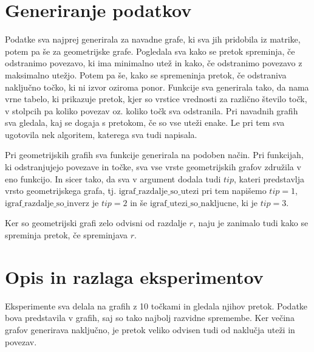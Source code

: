 \documentclass[a4paper]{article}
\begin{document}
\section{Generiranje podatkov}
Podatke sva najprej generirala za navadne grafe, ki sva jih pridobila iz matrike, potem pa še za geometrijske grafe. Pogledala sva kako se pretok spreminja, če odstranimo povezavo, ki ima minimalno utež in kako, če odstranimo povezavo z maksimalno utežjo. Potem pa še, kako se spremeninja pretok, če odstraniva naključno točko, ki ni izvor oziroma ponor. Funkcije sva generirala tako, da nama vrne tabelo, ki prikazuje pretok, kjer so  vrstice vrednosti za različno število točk, v stolpcih pa koliko povezav oz. koliko točk sva odstranila. Pri navadnih grafih sva gledala, kaj se dogaja s pretokom, če so vse uteži enake. Le pri tem sva ugotovila nek algoritem, katerega sva tudi napisala. 

Pri geometrijskih grafih sva funkcije generirala na podoben način. Pri funkcijah, ki odstranjujejo povezave in točke, sva vse vrste geometrijskih grafov združila v eno funkcijo. In sicer tako, da sva v argument dodala tudi $tip$, kateri predstavlja vrsto geometrijskega grafa, tj. $\text{igraf\_razdalje\_so\_utezi}$ pri tem napišemo $tip = 1$, $\text{igraf\_razdalje\_so\_inverz}$ je $tip = 2$ in še $\text{igraf\_utezi\_so\_nakljucne}$, ki je $tip = 3.$

Ker so geometrijski grafi zelo odvisni od razdalje $r$, naju je zanimalo tudi kako se spreminja pretok, če spreminjava $r$. 

\section{Opis in razlaga eksperimentov}

Eksperimente sva delala na grafih z 10 točkami in gledala njihov pretok. Podatke bova predstavila v grafih, saj so tako najbolj razvidne spremembe. Ker večina grafov generirava naključno, je pretok veliko odvisen tudi od naklučja uteži in povezav. 
\end{document}
